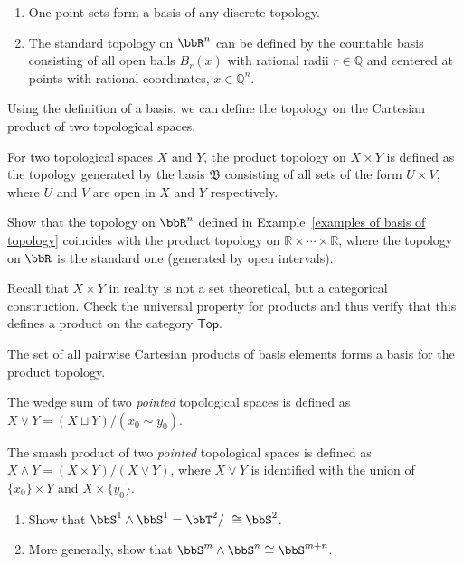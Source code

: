 \begin{example}\label{examples of basis of topology}
\begin{enumerate}
    \item One-point sets form a basis of any discrete topology.
    \item The standard topology on $\bbR^n$ can be defined by the countable basis consisting of all open balls $B_{r}(x)$ with rational radii $r\in\mathbb{Q}$ and centered at points with rational coordinates, $x\in\mathbb{Q}^n$.
\end{enumerate}
\end{example}

Using the definition of a basis, we can define the topology on the Cartesian product of two topological spaces.

\begin{defn}
For two topological spaces $X$ and $Y$, the product topology on $X\times Y$ is defined as the topology generated by the basis $\mathfrak{B}$ consisting of all sets of the form $U\times V$, where $U$ and $V$ are open in $X$ and $Y$ respectively.
\end{defn}

\begin{xca}
Show that the topology on $\bbR^n$ defined in Example~\ref{examples of basis of topology} coincides with the product topology on $\mathbb R\times \cdots \times \mathbb R$, where the topology on $\bbR $ is the standard one (generated by open intervals).
\end{xca}
\begin{xca}
Recall that $X\times Y$ in reality is not a set theoretical, but a categorical construction. Check the universal property for products and thus verify that this defines a product on the category $\mathsf{Top}$.
\end{xca}

\begin{rem}
The set of all pairwise Cartesian products of basis elements forms a basis for the product topology.
\end{rem}

\begin{defn}
    The wedge sum of two \emph{pointed} topological spaces is defined as $X\vee Y=(X\sqcup Y)/(x_0\sim y_0)$.
\end{defn}
\begin{defn}
    The smash product of two \emph{pointed} topological spaces is defined as $X\wedge Y=(X\times Y)/(X\vee Y)$, where $X\vee Y$ is identified with the union of $\{x_0\}\times Y$ and $X\times \{y_0\}$.
\end{defn}
\begin{xca}\label{wedge sums}
    \begin{enumerate}
        \item Show that $\bbS^1\wedge \bbS^1=\bbT^2/~\cong \bbS^2$.
        \item More generally, show that $\bbS^m\wedge \bbS^n\cong \bbS^{m+n}$.
    \end{enumerate}
\end{xca}


